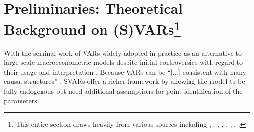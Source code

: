 \documentclass[a4paper,11pt,listof=nochaptergap,oneside,pointednumbers,bibtotoc,bigheadings,liststotoc,hidelinks]{scrbook}
\theoremstyle{mysatz}
\theoremstyle{mydefinition}
\theoremstyle{mytheorem}
\theoremstyle{mybemerkung}
\begin{document}
\section[Preliminaries: Theoretical Background on (S)VARs]{Preliminaries: Theoretical Background on (S)VARs\footnote{This entire section draws heavily from various sources including \citet{hamilton:94}, \citet{lutkepohl:05}, \citet{stockwatson:01}, \citet{villaramirez:10}, \citet{kunst:07}, \citet{whelan:16}, \citet{zivot:00}, \citet{foroni:14}.}}
With the seminal work of \citet{sims:80} VARs widely adopted in practice as an alternative to large scale macroeconometric models despite initial controversies with regard to their usage and interpretation \citep{canova:95, canova:95b}. Because VARs can be ``[...] consistent with many causal structures'' \citep[p. 1]{ludvigsonetal:20a}, SVARs offer a richer framework by allowing the model to be fully endogenous but need additional assumptions for point identification of the parameters.

\label{sec:TheoreticalBackgroundSVARs}
\end{document}
